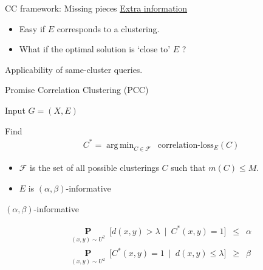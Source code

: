 \documentclass{beamer}
\newcommand{\mc}{\mathcal}
\newcommand{\mb}{\mathbf}
\DeclareMathOperator*{\argmin}{arg\,min}
\begin{document}
\begin{frame}[label=CCFramework]{CC framework: Missing pieces}
	\hyperlink{CCThoughts}{Extra information}
    \begin{itemize}
    	\vspace{10pt}\item Easy if $E$ corresponds to a clustering.\\
    	\vspace{10pt}\item What if the optimal solution is `close to' $E$ ? 
	\end{itemize}
	
	\vspace{30pt}Applicability of same-cluster queries.
	
\end{frame}

\begin{frame}{Promise Correlation Clustering (PCC)}
	\begin{block}{Input}
		$G = (X, E)$
	\end{block}
	
	\begin{block}{Find}
	\vspace{-15pt}\begin{align*}
	  &C^* = \argmin_{C \in \mc F} \enspace \text{correlation-loss}_{E}(C) \label{eqn:promiseCorrLoss}
	\end{align*}
	
	\vspace{-10pt}\begin{itemize}
		\item $\mc F$ is the set of all possible clusterings $C$ such that $m(C) \le M$.
		\item $E$ is $(\alpha, \beta)$-informative
	\end{itemize}		
	\end{block}
	
	\begin{block}{$(\alpha, \beta)$-informative}
		
		\vspace{-10pt}\begin{align*}
			&\underset{(x, y) \sim U^2}{\mb P}\enspace \big[ d(x, y) > \lambda \enspace|\enspace C^*(x, y) = 1\big] \enspace \le \enspace \alpha \\
			&\underset{(x, y) \sim U^2}{\mb P}\enspace \big[C^*(x, y) = 1 \enspace|\enspace d(x, y) \le \lambda \big] \enspace \ge \enspace \beta 
		\end{align*}
	\end{block}	
\end{frame}
\end{document}
